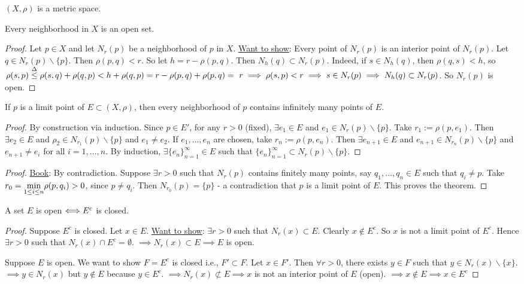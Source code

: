 \documentclass[]{article}
\begin{document}
$(X,\rho)$ is a metric space.

\begin{theorem}
	Every neighborhood in $X$ is an open set.
\end{theorem}
\begin{proof}
	Let $p\in X$ and let $N_r(p)$ be a neighborhood of $p$ in $X$.
	\ul{Want to show}: Every point of $N_r(p)$ is an interior point of $N_r(p)$.
	Let $q\in N_r(p)\backslash\{p\}$. Then $\rho(p,q)<r$. So let $h = r-\rho(p,q)$.
	Then $N_h(q)\subset N_r(p)$. Indeed, if $s\in N_h(q)$, then $\rho(q,s)<h$, so $\rho(s,p) \overset{\Delta}{\leq} \rho(s,q)+\rho(q,p) < h+ \rho(q,p) = r-\rho(p,q)+\rho(p,q) =~r \implies \rho(s,p) < r \implies s\in N_r(p) \implies N_h(q) \subset N_r(p)$.
	So $N_r(p)$ is open.
\end{proof}

\begin{theorem}
	If $p$ is a limit point of $E\subset (X,\rho)$, then every neighborhood of $p$ contains infinitely many points of $E$.
\end{theorem}
\begin{proof}
	By construction via induction. Since $p\in E'$, for any $r>0$ (fixed), $\exists e_1\in E$ and $e_1\in N_r(p)\backslash\{p\}$.
	Take $r_1 := \rho(p,e_1)$. Then $\exists e_2\in E$ and $\rho_2\in N_{r_1}(p)\backslash\{p\}$ and $e_1\neq e_2$.
	If $e_1,\dots,e_n$ are chosen, take $r_n:=\rho(p,e_n)$. Then $\exists e_{n+1}\in E$ and $e_{n+1}\in N_{r_n}(p)\backslash\{p\}$ and $e_{n+1}\neq e_i$ for all $i=1,\dots, n$.
	By induction, $\exists \{e_n\}_{n=1}^\infty\in E$ such that $\{e_n\}_{n=1}^\infty \subset N_r(p)\backslash\{p\}$.
\end{proof}
\begin{proof}
	\ul{Book}: By contradiction.
	Suppose $\exists r>0$ such that $N_r(p)$ contains finitely many points, say $q_1,\dots,q_n\in E$ such that $q_i\neq p$.
	Take $r_0 = \underset{1\leq i \leq n}{\min} \rho(p,q_i) > 0$, since $p\neq q_i$.
	Then $N_{r_0}(p) = \{p\}$ - a contradiction that $p$ is a limit point of $E$. This proves the theorem.
\end{proof}

\begin{theorem}
	A set $E$ is open $\Longleftrightarrow E^c$ is closed.
\end{theorem}
\begin{proof}
	\say{$\Lla$} Suppose $E^c$ is closed. Let $x\in E$.
	\ul{Want to show}: $\exists r>0$ such that $N_r(x)\subset E$.
	Clearly $x\notin E^c$. So $x$ is not a limit point of $E^c$.
	Hence $\exists r>0$ such that $N_r(x)\cap E^c = \emptyset$.
	$\implies N_r(x) \subset E \implies E$ is open.

	\say{$\implies$} Suppose $E$ is open. We want to show $F=E^c$ is closed i.e., $F'\subset F$.
	Let $x\in F'$. Then $\forall r>0$, there exists $y\in F$ such that $y\in N_r(x)\backslash\{x\}$.
	$\implies y\in N_r(x)$ but $y\notin E$ because $y\in E^c$.
	$\implies N_r(x)\not\subset E \implies x$ is not an interior point of $E$ (open).
	$\implies x\notin E \implies x\in E^c$
\end{proof}
\end{document}
